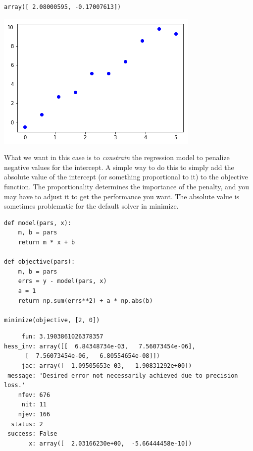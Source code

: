 \documentclass[11pt]{article}
\begin{document}
\begin{verbatim}
array([ 2.08000595, -0.17007613])
\end{verbatim}



\begin{center}
\includegraphics[width=.9\linewidth]{obipy-resources/37c51028cef42d76546d882661b04271-2026405Q.png}
\end{center}

What we want in this case is to \emph{constrain} the regression model to penalize negative values for the intercept. A simple way to do this to simply add the absolute value of the intercept (or something proportional to it) to the objective function. The proportionality determines the importance of the penalty, and you may have to adjust it to get the performance you want. The absolute value is sometimes problematic for the default solver in minimize.

\begin{verbatim}
def model(pars, x):
    m, b = pars
    return m * x + b

def objective(pars):
    m, b = pars
    errs = y - model(pars, x)
    a = 1
    return np.sum(errs**2) + a * np.abs(b)

minimize(objective, [2, 0])
\end{verbatim}

\begin{verbatim}
     fun: 3.1903861026378357
hess_inv: array([[  6.84348734e-03,   7.56073454e-06],
      [  7.56073454e-06,   6.80554654e-08]])
     jac: array([ -1.09505653e-03,   1.90831292e+00])
 message: 'Desired error not necessarily achieved due to precision loss.'
    nfev: 676
     nit: 11
    njev: 166
  status: 2
 success: False
       x: array([  2.03166230e+00,  -5.66444458e-10])
\end{verbatim}
\end{document}
